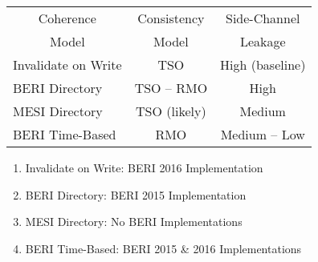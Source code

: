 	\begin{table}[h]
	\begin{center}
	\begin{tabular}[c]{|l|c|c|}
		\hline
		\multicolumn{1}{|c|}{Coherence} & Consistency & Side-Channel \\
		\multicolumn{1}{|c|}{Model} & Model & Leakage \\
		\hline
		Invalidate on Write & TSO & High (baseline) \\
		BERI Directory & TSO -- RMO & High \\
		MESI Directory & TSO (likely) & Medium \\
		BERI Time-Based & RMO & Medium -- Low \\
		\hline
	\end{tabular}
	\end{center}
	\end{table}
	
	\begin{enumerate}
		\item Invalidate on Write: BERI 2016 Implementation 
		\item BERI Directory: BERI 2015 Implementation
		\item MESI Directory: No BERI Implementations 
		\item BERI Time-Based: BERI 2015 \& 2016 Implementations
	\end{enumerate}




